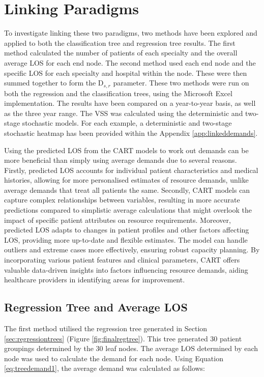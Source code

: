 \documentclass[../thesis.tex]{subfiles}
\begin{document}
\section{Linking Paradigms}\label{sec:linking}
To investigate linking these two paradigms, two methods have been explored and applied to both the classification tree and regression tree results. The first method calculated the number of patients of each specialty and the overall average LOS for each end node. The second method used each end node and the specific LOS for each specialty and hospital within the node. These were then summed together to form the D$_{s,r}$ parameter. These two methods were run on both the regression and the classification trees, using the Microsoft Excel implementation. The results have been compared on a year-to-year basis, as well as the three year range. The VSS was calculated using the deterministic and two-stage stochastic models. For each example, a deterministic and two-stage stochastic heatmap has been provided within the Appendix \ref{app:linkeddemands}.

Using the predicted LOS from the CART models to work out demands can be more beneficial than simply using average demands due to several reasons. Firstly, predicted LOS accounts for individual patient characteristics and medical histories, allowing for more personalised estimates of resource demands, unlike average demands that treat all patients the same. Secondly, CART models can capture complex relationships between variables, resulting in more accurate predictions compared to simplistic average calculations that might overlook the impact of specific patient attributes on resource requirements. Moreover, predicted LOS adapts to changes in patient profiles and other factors affecting LOS, providing more up-to-date and flexible estimates. The model can handle outliers and extreme cases more effectively, ensuring robust capacity planning. By incorporating various patient features and clinical parameters, CART offers valuable data-driven insights into factors influencing resource demands, aiding healthcare providers in identifying areas for improvement.

\subsection{Regression Tree and Average LOS}
The first method utilised the regression tree generated in Section \ref{sec:regressiontrees} (Figure \ref{fig:finalregtree}). This tree generated 30 patient groupings determined by the 30 leaf nodes. The average LOS determined by each node was used to calculate the demand for each node. Using Equation \eqref{eq:treedemand1}, the average demand was calculated as follows:
\end{document}
